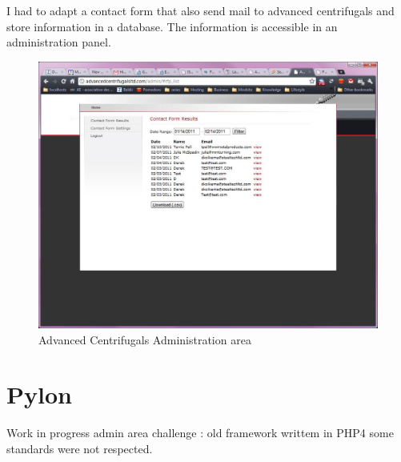 I had to adapt a contact form that also send mail to advanced centrifugals and store information in a database.
The information is accessible in an administration panel.

\begin{figure}[!h]
\centering
\includegraphics[width=.55\textwidth]{img/adv_2.jpg}
\caption{Advanced Centrifugals Administration area}
\label{figure:adv_2}
\end{figure}

\section{Pylon}
Work in progress
admin area
challenge : old framework writtem in PHP4
some standards were not respected.
